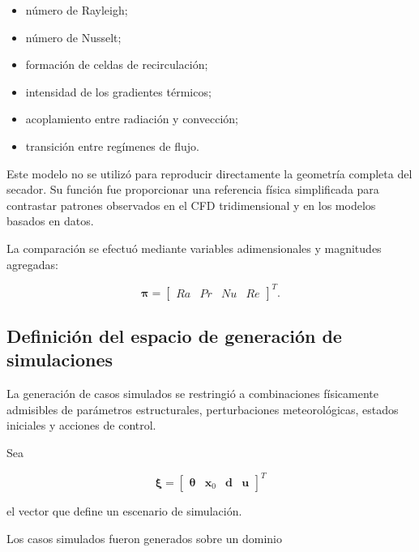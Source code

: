 \begin{itemize}
    \item número de Rayleigh;
    \item número de Nusselt;
    \item formación de celdas de recirculación;
    \item intensidad de los gradientes térmicos;
    \item acoplamiento entre radiación y convección;
    \item transición entre regímenes de flujo.
\end{itemize}

Este modelo no se utilizó para reproducir directamente la geometría completa del secador. Su función fue proporcionar una referencia física simplificada para contrastar patrones observados en el CFD tridimensional y en los modelos basados en datos.

La comparación se efectuó mediante variables adimensionales y magnitudes agregadas:

\begin{equation}
\boldsymbol{\pi}
=
\begin{bmatrix}
Ra &
Pr &
Nu &
Re
\end{bmatrix}^{T}.
\label{eq:variables_adimensionales_validacion_cruzada}
\end{equation}

\subsection{Definición del espacio de generación de simulaciones}
\label{subsec:espacio_generacion_simulaciones}

La generación de casos simulados se restringió a combinaciones físicamente admisibles de parámetros estructurales, perturbaciones meteorológicas, estados iniciales y acciones de control.

Sea

\begin{equation}
\boldsymbol{\xi}
=
\begin{bmatrix}
\boldsymbol{\theta} &
\mathbf{x}_0 &
\mathbf{d} &
\mathbf{u}
\end{bmatrix}^{T}
\end{equation}

el vector que define un escenario de simulación.

Los casos simulados fueron generados sobre un dominio

